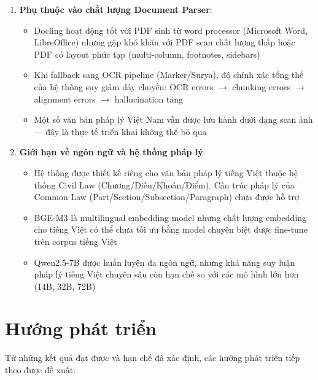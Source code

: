 \begin{enumerate}[label=(\arabic*)]
    \item \textbf{Phụ thuộc vào chất lượng Document Parser}:
    \begin{itemize}
        \item Docling hoạt động tốt với PDF sinh từ word processor (Microsoft Word, LibreOffice) nhưng gặp khó khăn với PDF scan chất lượng thấp hoặc PDF có layout phức tạp (multi-column, footnotes, sidebars)
        \item Khi fallback sang OCR pipeline (Marker/Surya), độ chính xác tổng thể của hệ thống suy giảm dây chuyền: OCR errors $\rightarrow$ chunking errors $\rightarrow$ alignment errors $\rightarrow$ hallucination tăng
        \item Một số văn bản pháp lý Việt Nam vẫn được lưu hành dưới dạng scan ảnh — đây là thực tế triển khai không thể bỏ qua
    \end{itemize}

    \item \textbf{Giới hạn về ngôn ngữ và hệ thống pháp lý}:
    \begin{itemize}
        \item Hệ thống được thiết kế riêng cho văn bản pháp lý tiếng Việt thuộc hệ thống Civil Law (Chương/Điều/Khoản/Điểm). Cấu trúc pháp lý của Common Law (Part/Section/Subsection/Paragraph) chưa được hỗ trợ
        \item BGE-M3 là multilingual embedding model nhưng chất lượng embedding cho tiếng Việt có thể chưa tối ưu bằng model chuyên biệt được fine-tune trên corpus tiếng Việt
        \item Qwen2.5-7B được huấn luyện đa ngôn ngữ, nhưng khả năng suy luận pháp lý tiếng Việt chuyên sâu còn hạn chế so với các mô hình lớn hơn (14B, 32B, 72B)
    \end{itemize}

\end{enumerate}

\section{Hướng phát triển}

Từ những kết quả đạt được và hạn chế đã xác định, các hướng phát triển tiếp theo được đề xuất:

